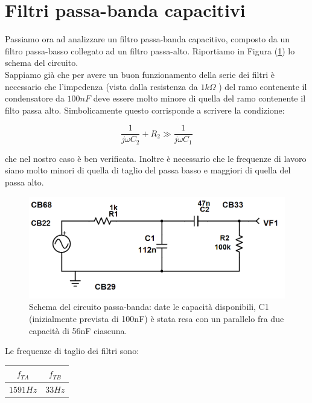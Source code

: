 \documentclass[journal, a4paper]{IEEEtran}
\begin{document}
\section{Filtri passa-banda capacitivi}
Passiamo ora ad analizzare un filtro passa-banda capacitivo, composto da un filtro passa-basso collegato ad un filtro passa-alto. Riportiamo in Figura (\ref{fig:breadboard2_passabanda}) lo schema del circuito. \\

Sappiamo già che per avere un buon funzionamento della serie dei filtri è necessario che l'impedenza (vista dalla resistenza da $ 1 k\Omega $ ) del ramo contenente il condensatore da $ 100 nF $ deve essere molto minore di quella del ramo contenente il filto passa alto. Simbolicamente questo corrisponde a scrivere la condizione:

\begin{equation}
\frac{1}{j\omega C_2} + R_2 \gg \frac{1}{j\omega C_1}
\end{equation}

che nel nostro caso è ben verificata. Inoltre è necessario che le frequenze di lavoro siano molto minori di quella di taglio del passa basso e maggiori di quella del passa alto.

\begin{figure}
\centering
\includegraphics[width=0.7\linewidth]{./breadboard2_passabanda}
\caption{Schema del circuito passa-banda: date le capacità disponibili, C1 (inizialmente prevista di 100nF) è stata resa con un parallelo fra due capacità di 56nF ciascuna.}
\label{fig:breadboard2_passabanda}
\end{figure}


Le frequenze di taglio dei filtri sono:\\

\begin{tabular}{|c|c|}
\hline $f_{TA}$ & $f_{TB} $\\ 
\hline $1591 \si{Hz}$ & $33 \si{Hz}$ \\ 
\hline 
\end{tabular} \\
\end{document}
